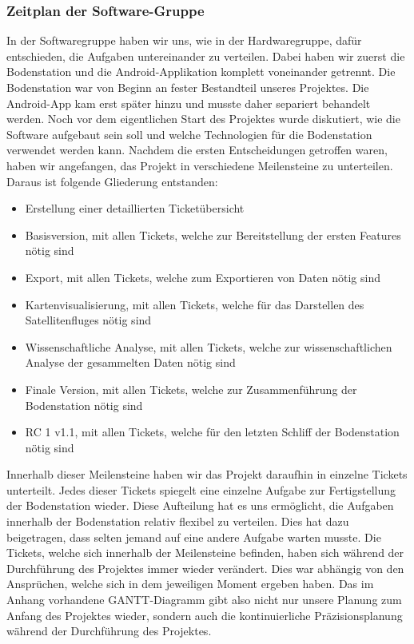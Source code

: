 \subsubsection{Zeitplan der Software-Gruppe}
In der Softwaregruppe haben wir uns, wie in der Hardwaregruppe, dafür entschieden, die Aufgaben untereinander zu verteilen. Dabei haben wir zuerst die Bodenstation und die Android-Applikation komplett voneinander getrennt. Die Bodenstation war von Beginn an fester Bestandteil unseres Projektes. Die Android-App kam erst später hinzu und musste daher separiert behandelt werden. Noch vor dem eigentlichen Start des Projektes wurde diskutiert, wie die Software aufgebaut sein soll und welche Technologien für die Bodenstation verwendet werden kann. Nachdem die ersten Entscheidungen getroffen waren, haben wir angefangen, das Projekt in verschiedene Meilensteine zu unterteilen. Daraus ist folgende Gliederung entstanden:
\begin{itemize}
    \item Erstellung einer detaillierten Ticketübersicht
    \item Basisversion, mit allen Tickets, welche zur Bereitstellung der ersten Features nötig sind
    \item Export, mit allen Tickets, welche zum Exportieren von Daten nötig sind
    \item Kartenvisualisierung, mit allen Tickets, welche für das Darstellen des Satellitenfluges nötig sind
    \item Wissenschaftliche Analyse, mit allen Tickets, welche zur wissenschaftlichen Analyse der gesammelten Daten nötig sind
    \item Finale Version, mit allen Tickets, welche zur Zusammenführung der Bodenstation nötig sind
    \item RC 1 v1.1, mit allen Tickets, welche für den letzten Schliff der Bodenstation nötig sind
\end{itemize}
Innerhalb dieser Meilensteine haben wir das Projekt daraufhin in einzelne Tickets unterteilt. Jedes dieser Tickets spiegelt eine einzelne Aufgabe zur Fertigstellung der Bodenstation wieder. Diese Aufteilung hat es uns ermöglicht, die Aufgaben innerhalb der Bodenstation relativ flexibel zu verteilen. Dies hat dazu beigetragen, dass selten jemand auf eine andere Aufgabe warten musste. Die Tickets, welche sich innerhalb der Meilensteine befinden, haben sich während der Durchführung des Projektes immer wieder verändert. Dies war abhängig von den Ansprüchen, welche sich in dem jeweiligen Moment ergeben haben. Das im Anhang vorhandene GANTT-Diagramm gibt also nicht nur unsere Planung zum Anfang des Projektes wieder, sondern auch die kontinuierliche Präzisionsplanung während der Durchführung des Projektes.

